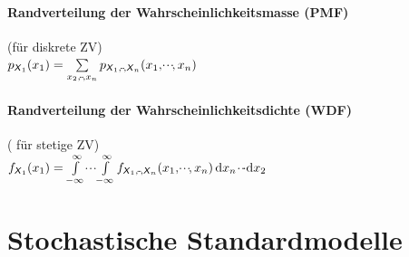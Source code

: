 \documentclass[german,color,6pt]{latex4ei/latex4ei_sheet}
\begin{document}
\begin{sectionbox}
	\paragraph{Randverteilung der Wahrscheinlichkeitsmasse (PMF)}
	(für diskrete ZV) \\
	$p_{\X_1}(x_1) = \sum\limits_{x_2,\shdots,x_n}{p_{\X_1,\shdots,\X_n}(x_1,\shdots,x_n)}$
	
	\paragraph{Randverteilung der Wahrscheinlichkeitsdichte (WDF)} ( für stetige ZV) \\
	$f_{\X_1}(x_1) = \int\limits_{-\infty}^{\infty}{\shdots\int\limits_{-\infty}^{\infty}{f_{\X_1,\shdots,\X_n}(x_1,\shdots,x_n)\diff x_n\shdots}\diff x_2}$
\end{sectionbox}

\section{Stochastische Standardmodelle}
\end{document}
